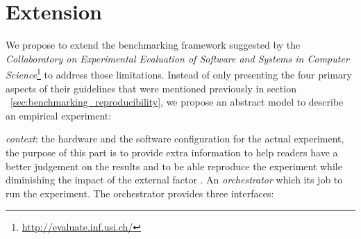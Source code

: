 
\section{Extension}\label{sec:bench_extension}
We propose to extend the benchmarking framework suggested by the \emph{Collaboratory on Experimental Evaluation of Software and Systems in Computer Science}\footnote{\url{http://evaluate.inf.usi.ch/}} to address those limitations.
Instead of only presenting the four primary aspects of their guidelines that were mentioned previously in section ~\ref{sec:benchmarking_reproducibility}, we propose an abstract model to describe an empirical experiment:

\emph{context}: the hardware and the software configuration for the actual experiment, the purpose of this part is to provide extra information to help readers have a better judgement on the results and to be able reproduce the experiment while diminishing the impact of the external factor .
An \emph{orchestrator} which its job to run the experiment.
The orchestrator provides three interfaces:


